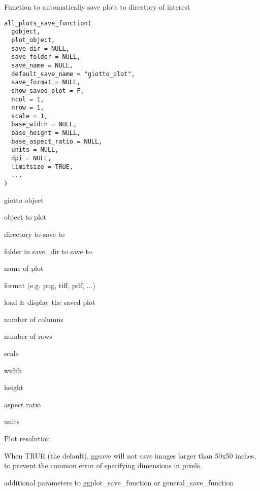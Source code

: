 \documentclass[a4paper]{book}
\begin{document}
%
\begin{Description}\relax
Function to automatically save plots to directory of interest
\end{Description}
%
\begin{Usage}
\begin{verbatim}
all_plots_save_function(
  gobject,
  plot_object,
  save_dir = NULL,
  save_folder = NULL,
  save_name = NULL,
  default_save_name = "giotto_plot",
  save_format = NULL,
  show_saved_plot = F,
  ncol = 1,
  nrow = 1,
  scale = 1,
  base_width = NULL,
  base_height = NULL,
  base_aspect_ratio = NULL,
  units = NULL,
  dpi = NULL,
  limitsize = TRUE,
  ...
)
\end{verbatim}
\end{Usage}
%
\begin{Arguments}
\begin{ldescription}
\item[\code{gobject}] giotto object

\item[\code{plot\_object}] object to plot

\item[\code{save\_dir}] directory to save to

\item[\code{save\_folder}] folder in save\_dir to save to

\item[\code{save\_name}] name of plot

\item[\code{save\_format}] format (e.g. png, tiff, pdf, ...)

\item[\code{show\_saved\_plot}] load \& display the saved plot

\item[\code{ncol}] number of columns

\item[\code{nrow}] number of rows

\item[\code{scale}] scale

\item[\code{base\_width}] width

\item[\code{base\_height}] height

\item[\code{base\_aspect\_ratio}] aspect ratio

\item[\code{units}] units

\item[\code{dpi}] Plot resolution

\item[\code{limitsize}] When TRUE (the default), ggsave will not save images larger than 50x50 inches, to prevent the common error of specifying dimensions in pixels.

\item[\code{...}] additional parameters to ggplot\_save\_function or general\_save\_function
\end{ldescription}
\end{Arguments}
\end{document}
